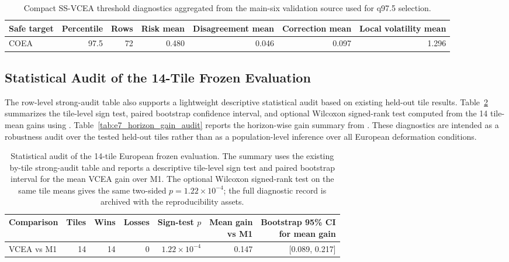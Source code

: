 \documentclass[lettersize,journal]{IEEEtran}
\begin{document}
\begin{table}[!t]
\centering
\scriptsize
\begin{adjustbox}{max width=\textwidth}
\begin{tabular}{lrrrrrr}
\toprule
Safe target & Percentile & Rows & Risk mean & Disagreement mean & Correction mean & Local volatility mean \\
\midrule
COEA & 97.5 & 72 & 0.480 & 0.046 & 0.097 & 1.296 \\
\bottomrule
\end{tabular}
\end{adjustbox}
\caption{Compact SS-VCEA threshold diagnostics aggregated from the main-six validation source used for q97.5 selection.}
\label{tab:e7_threshold_diag_compact}
\end{table}

\subsection{Statistical Audit of the 14-Tile Frozen Evaluation}
\label{app:e7_statistical_audit}
The row-level strong-audit table also supports a lightweight descriptive statistical audit based on existing held-out tile results. Table~\ref{tab:e7_stat_audit} summarizes the tile-level sign test, paired bootstrap confidence interval, and optional Wilcoxon signed-rank test computed from the 14 tile-mean gains using . Table~\ref{tab:e7_horizon_gain_audit} reports the horizon-wise gain summary from . These diagnostics are intended as a robustness audit over the tested held-out tiles rather than as a population-level inference over all European deformation conditions.

\begin{table}[!t]
\centering
\scriptsize
\begin{adjustbox}{max width=\textwidth}
\begin{tabular}{lrrrrrr}
\toprule
Comparison & Tiles & Wins & Losses & \shortstack{Sign-test\\$p$} & \shortstack{Mean gain\\vs M1} & \shortstack{Bootstrap 95\% CI\\for mean gain} \\
\midrule
VCEA vs M1 & 14 & 14 & 0 & $1.22\times10^{-4}$ & 0.147 & [0.089, 0.217] \\
\bottomrule
\end{tabular}
\end{adjustbox}
\caption{Statistical audit of the 14-tile European frozen evaluation. The summary uses the existing by-tile strong-audit table and reports a descriptive tile-level sign test and paired bootstrap interval for the mean VCEA gain over M1. The optional Wilcoxon signed-rank test on the same tile means gives the same two-sided $p=1.22\times10^{-4}$; the full diagnostic record is archived with the reproducibility assets.}
\label{tab:e7_stat_audit}
\end{table}
\end{document}
